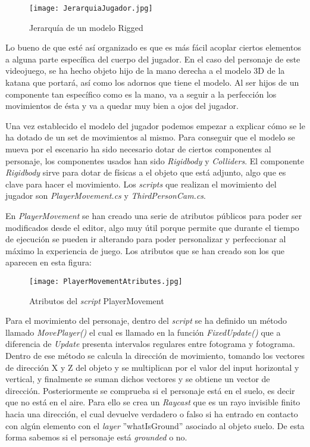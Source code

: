 \begin{figure}[H]
    \centering
    \texttt{[image: JerarquiaJugador.jpg]}
    \caption{Jerarquía de un modelo Rigged}
\end{figure}

Lo bueno de que esté así organizado es que es más fácil acoplar ciertos elementos a alguna parte específica del cuerpo del jugador. En el caso del personaje de este videojuego, se ha hecho objeto hijo de la mano derecha a el modelo 3D de la katana que portará, así como los adornos que tiene el modelo. Al ser hijos de un componente tan específico como es la mano, va a seguir a la perfección los movimientos de ésta y va a quedar muy bien a ojos del jugador.

Una vez establecido el modelo del jugador podemos empezar a explicar cómo se le ha dotado de un set de movimientos al mismo. Para conseguir que el modelo se mueva por el escenario ha sido necesario dotar de ciertos componentes al personaje, los componentes usados han sido \textit{Rigidbody} y \textit{Colliders}. El componente \textit{Rigidbody} sirve para dotar de físicas a el objeto que está adjunto, algo que es clave para hacer el movimiento. Los \textit{scripts} que realizan el movimiento del jugador son \textit{PlayerMovement.cs} y \textit{ThirdPersonCam.cs}. 

En \textit{PlayerMovement} se han creado una serie de atributos públicos para poder ser modificados desde el editor, algo muy útil porque permite que durante el tiempo de ejecución se pueden ir alterando para poder personalizar y perfeccionar al máximo la experiencia de juego. Los atributos que se han creado son los que aparecen en esta figura:

\begin{figure}[H]
    \centering
    \texttt{[image: PlayerMovementAtributes.jpg]}
    \caption{Atributos del \textit{script} PlayerMovement}
\end{figure}

Para el movimiento del personaje, dentro del \textit{script} se ha definido un método llamado \textit{MovePlayer()} el cual es llamado en la función \textit{FixedUpdate()} que a diferencia de \textit{Update} presenta intervalos regulares entre fotograma y fotograma. Dentro de ese método se calcula la dirección de movimiento, tomando los vectores de dirección X y Z del objeto y se multiplican por el valor del input horizontal y vertical, y finalmente se suman dichos vectores y se obtiene un vector de dirección. Posteriormente se comprueba si el personaje está en el suelo, es decir que no está en el aire. Para ello se crea un \textit{Raycast} que es un rayo invisible finito hacia una dirección, el cual devuelve verdadero o falso si ha entrado en contacto con algún elemento con el \textit{layer} ''whatIsGround'' asociado al objeto suelo. De esta forma sabemos si el personaje está \textit{grounded} o no.

